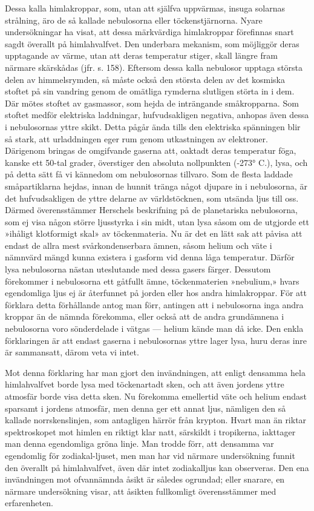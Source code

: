\documentclass[a4paper, 12pt, oneside, swedish]{article}
\begin{document}
Dessa kalla himlakroppar, som, utan att själfva uppvärmas, insuga solarnas strålning, äro de så kallade nebulosorna eller töckenstjärnorna. Nyare undersökningar ha visat, att dessa märkvärdiga himlakroppar förefinnas snart sagdt överallt på himlahvalfvet. Den underbara mekanism, som möjliggör deras upptagande av värme, utan att deras temperatur stiger, skall längre fram närmare skärskådas (jfr. s. 158). Eftersom dessa kalla nebulosor upptaga största delen av himmelsrymden, så måste också den största delen av det kosmiska stoftet på sin vandring genom de omätliga rymderna slutligen störta in i dem. Där mötes stoftet av gasmassor, som hejda de inträngande småkropparna. Som stoftet medför elektriska laddningar, hufvudsakligen negativa, anhopas även dessa i nebulosornas yttre skikt. Detta pågår ända tills den elektriska spänningen blir så stark, att urladdningen eger rum genom utkastningen av elektroner. Därigenom bringas de omgifvande gaserna att, oaktadt deras temperatur föga, kanske ett 50-tal grader, överstiger den absoluta nollpunkten (-273° C.), lysa, och på detta sätt få vi kännedom om nebulosornas tillvaro. Som de flesta laddade småpartiklarna hejdas, innan de hunnit tränga något djupare in i nebulosorna, är det hufvudsakligen de yttre delarne av världstöcknen, som utsända ljus till oss. Därmed överensstämmer Herschels beskrifning på de planetariska nebulosorna, som ej visa någon större ljusstyrka i sin midt, utan lysa såsom om de utgjorde ett »ihåligt klotformigt skal» av töckenmateria. Nu är det en lätt sak att påvisa att endast de allra mest svårkondenserbara ämnen, såsom helium och väte i nämnvärd mängd kunna existera i gasform vid denna låga temperatur. Därför lysa nebulosorna nästan uteslutande med dessa gasers färger. Dessutom förekommer i nebulosorna ett gåtfullt ämne, töckenmaterien »nebulium,» hvars egendomliga ljus ej är återfunnet på jorden eller hos andra himlakroppar. För att förklara detta förhållande antog man förr, antingen att i nebulosorna inga andra kroppar än de nämnda förekomma, eller också att de andra grundämnena i nebulosorna voro sönderdelade i vätgas --- helium kände man då icke. Den enkla förklaringen är att endast gaserna i nebulosornas yttre lager lysa, huru deras inre är sammansatt, därom veta vi intet.

Mot denna förklaring har man gjort den invändningen, att enligt densamma hela himlahvalfvet borde lysa med töckenartadt sken, och att även jordens yttre atmosfär borde visa detta sken. Nu förekomma emellertid väte och helium endast sparsamt i jordens atmosfär, men denna ger ett annat ljus, nämligen den så kallade norrskenslinjen, som antagligen härrör från krypton. Hvart man än riktar spektroskopet mot himlen en riktigt klar natt, särskildt i tropikerna, iakttager man denna egendomliga gröna linje. Man trodde förr, att densamma var egendomlig för zodiakal-ljuset, men man har vid närmare undersökning funnit den överallt på himlahvalfvet, även där intet zodiakalljus kan observeras. Den ena invändningen mot ofvannämnda åsikt är således ogrundad; eller snarare, en närmare undersökning visar, att åsikten fullkomligt överensstämmer med erfarenheten.
\end{document}
